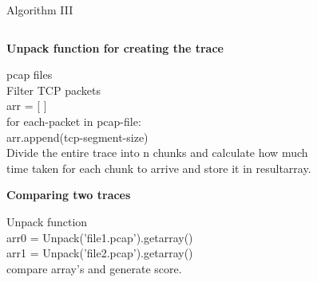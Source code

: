 \documentclass{beamer}
\begin{document}
\begin{frame}{Algorithm III}
    \begin{columns}
        \begin{column}{0.5\textwidth}
            \begin{algorithm}
                \scriptsize
                \hline
                \caption{\textbf{Unpack function for creating the trace}}\label{alg:cap}
                \hline
                \begin{algorithmic}
                \Require pcap files
                \\
                  \hspace{1em} Filter TCP packets \\
                  \hspace{1em} arr = [ ] \\ 
                  \hspace{1em} for each-packet in pcap-file: \\
                  \hspace{2em} arr.append(tcp-segment-size) \\
                  \hspace{1em} Divide the entire trace into n chunks and calculate how much \\
                  \hspace{1em} time taken for each chunk to arrive and store it in resultarray.
                \end{algorithmic}
            \end{algorithm}
            \hline
            \begin{algorithm}
                \scriptsize
                \hline
                \caption{\textbf{Comparing two traces}}\label{alg:cap}
                \hline
                \begin{algorithmic}
                \Require Unpack function
                \\
                    \hspace{1em} arr0 = Unpack('file1.pcap').getarray() \\
                    \hspace{1em} arr1 = Unpack('file2.pcap').getarray() \\
                    \hspace{1em} compare array's and generate score.

\end{algorithmic}
\end{algorithm}
\end{column}
\end{columns}
\end{frame}
\end{document}
